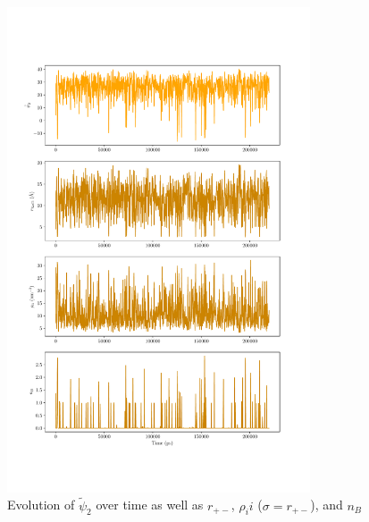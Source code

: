 \begin{spacing}{2.0}
    \begin{figure}[h]
        \centering
        \includegraphics[width=0.8\textwidth]{./figs/fig3-02}
        \caption{Evolution of $\tilde{\psi}_2$ over time as well as $r_{+-}$, $\rho_ii$ ($\sigma = r_{+-}$), and $n_B$}
        \label{fig:time-correlation-psi2}
    \end{figure}


\end{spacing}
